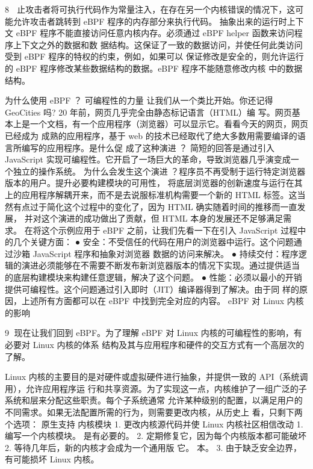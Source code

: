                                                                   8
  止攻击者将可执行代码作为常量注入，在存在另一个内核错误的情况下，这可能允许攻击者跳转到
  eBPF 程序的内存部分来执行代码。
抽象出来的运行时上下文
eBPF 程序不能直接访问任意内核内存。必须通过 eBPF helper 函数来访问程序上下文之外的数据和数
据结构。这保证了一致的数据访问，并使任何此类访问受到 eBPF 程序的特权的约束，例如，如果可以
保证修改是安全的，则允许运行的 eBPF 程序修改某些数据结构的数据。eBPF 程序不能随意修改内核
中的数据结构。

为什么使用 eBPF ？
可编程性的力量
让我们从一个类比开始。你还记得 GeoCities 吗? 20 年前，网页几乎完全由静态标记语言（HTML）编
写。网页基本上是一个文档，有一个应用程序（浏览器）可以显示它。看看今天的网页，网页已经成为
成熟的应用程序，基于 web 的技术已经取代了绝大多数用需要编译的语言所编写的应用程序。是什么促
成了这种演进 ？
简短的回答是通过引入 JavaScript 实现可编程性。它开启了一场巨大的革命，导致浏览器几乎演变成一
个独立的操作系统。
为什么会发生这个演进 ？程序员不再受制于运行特定浏览器版本的用户。提升必要构建模块的可用性，
将底层浏览器的创新速度与运行在其上的应用程序解耦开来，而不是去说服标准机构需要一个新的
HTML 标签。这当然有点过于简化这个过程中的变化了，因为 HTML 确实随着时间的推移而一直发展，
并对这个演进的成功做出了贡献，但 HTML 本身的发展还不足够满足需求。
在将这个示例应用于 eBPF 之前，让我们先看一下在引入 JavaScript 过程中的几个关键方面：
 ● 安全：不受信任的代码在用户的浏览器中运行。这个问题通过沙箱 JavaScript 程序和抽象对浏览器
   数据的访问来解决。
 ● 持续交付：程序逻辑的演进必须能够在不需要不断发布新浏览器版本的情况下实现。通过提供适当
   的底层构建模块来构建任意逻辑，解决了这个问题。
 ● 性能：必须以最小的开销提供可编程性。这个问题通过引入即时（JIT）编译器得到了解决。由于同
   样的原因，上述所有方面都可以在 eBPF 中找到完全对应的内容。
eBPF 对 Linux 内核的影响

                                                         9
现在让我们回到 eBPF。为了理解 eBPF 对 Linux 内核的可编程性的影响，有必要对 Linux 内核的体系
结构及其与应用程序和硬件的交互方式有一个高层次的了解。




Linux 内核的主要目的是对硬件或虚拟硬件进行抽象，并提供一致的 API（系统调用），允许应用程序运
行和共享资源。为了实现这一点，内核维护了一组广泛的子系统和层来分配这些职责。每个子系统通常
允许某种级别的配置，以满足用户的不同需求。如果无法配置所需的行为，则需要更改内核，从历史上
看，只剩下两个选项：
 原生支持                        内核模块
 1. 更改内核源代码并使 Linux 内核社区相信改动 1. 编写一个内核模块。
 是有必要的。                      2. 定期修复它，因为每个内核版本都可能破坏
 2. 等待几年后，新的内核才会成为一个通用版 它。
 本。                          3. 由于缺乏安全边界，有可能损坏 Linux 内核。


